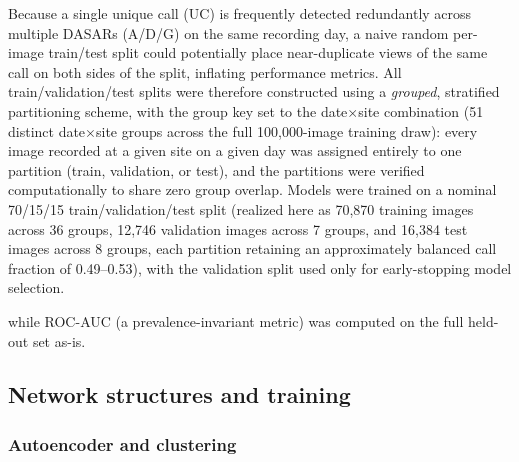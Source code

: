 \documentclass[preprint,NumberedRefs]{JASAnew}
\begin{document}
Because a single unique call (UC) is frequently detected redundantly across multiple DASARs (A/D/G) on the same recording day, a naive random
per-image train/test split could potentially place near-duplicate views of the same
call on both sides of the split, inflating performance metrics. All
train/validation/test splits were therefore constructed using a
\emph{grouped}, stratified partitioning scheme, with the group key set to
the date$\times$site combination (51 distinct date$\times$site groups
across the full 100,000-image training draw): every image recorded at a
given site on a given day was assigned entirely to one partition (train,
validation, or test), and the partitions were verified computationally to
share zero group overlap. Models were trained on a nominal 70/15/15
train/validation/test split (realized here as 70,870 training images
across 36 groups, 12,746 validation images across 7 groups, and 16,384
test images across 8 groups, each partition retaining an approximately
balanced call fraction of 0.49--0.53), with the validation split used only
for early-stopping model selection.

while ROC-AUC (a prevalence-invariant metric) was computed on the full
held-out set as-is.



\subsection{\label{sec:autoencoder} Network structures and training}

\subsubsection{Autoencoder and clustering}
\end{document}
